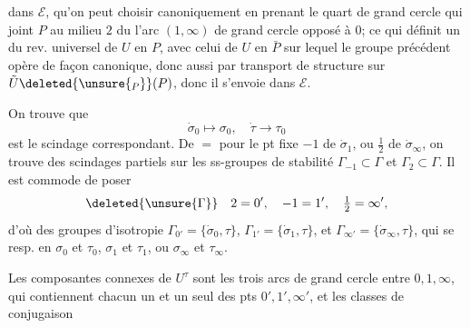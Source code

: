 dans $\mathcal E$, qu'on peut choisir canoniquement en prenant le quart de grand cercle qui joint $P$ au milieu $2$ du  l'arc $(1,\infty)$ de grand cercle opposé à $0$; ce qui définit un  du rev. universel de $U$ en $P$, avec celui de $U$ en $\bar P$ sur lequel le groupe précédent opère de façon canonique, donc aussi par transport de structure sur $\tilde U\deleted{\unsure{_P}}(P)$, donc il s'envoie dans $\mathcal E$.

On trouve que
\[
\dot\sigma_0\mapsto\sigma_0,\quad\dot\tau\to\tau_0
\]
est le scindage correspondant. De $=$ pour le pt fixe $-1$ de $\dot\sigma_1$, ou $\frac12$ de $\dot\sigma_\infty$, on trouve des scindages partiels sur les ss-groupes de  stabilité $\Gamma_{-1}\subset\Gamma$ et $\Gamma_2\subset\Gamma$. Il est commode de poser
\[
\deleted{\unsure{\Gamma}}\quad 2=0',\quad -1=1',\quad \tfrac12=\infty',
\]
d'où des groupes d'isotropie $\Gamma_{0'}=\{\dot\sigma_0,\tau\}$, $\Gamma_{1'}=\{\dot\sigma_1,\tau\}$, et $\Gamma_{\infty'}=\{\dot\sigma_\infty,\tau\}$, qui se  resp. en $\sigma_0$ et $\tau_0$,  $\sigma_1$ et $\tau_1$, ou $\sigma_\infty$ et $\tau_\infty$.

Les composantes connexes de $U^\tau$ sont les trois arcs de grand cercle entre $0,1,\infty$, qui contiennent chacun un  et un seul des pts $0',1',\infty'$, et les classes de conjugaison
